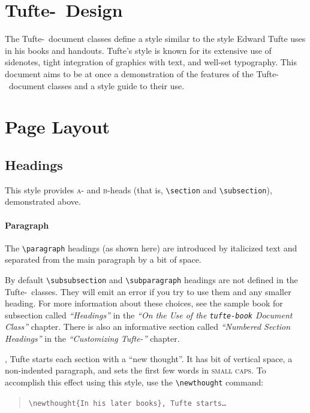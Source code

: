 \documentclass[a4paper]{tufte-handout}
\newcommand{\TL}{Tufte-\hologo{LaTeX}\xspace}
\newcommand{\hlorange}[1]{\textcolor{tufte-orange}{#1}}
\newcommand{\doccmd}[1]{\hlorange{\texttt{\textbackslash#1}}}
\newenvironment{docspec}
  {\begin{quotation}\ttfamily\parskip0pt\parindent0pt\ignorespaces}
  {\end{quotation}}
\begin{document}
\section{\TL\ Design}\label{sec:tufte-latex-design}
The \TL\ document classes define a style similar to the style Edward Tufte uses in his books and handouts.
Tufte's style is known for its extensive use of sidenotes, tight integration of graphics with text, and well-set typography.
This document aims to be at once a demonstration of the features of the \TL\ document classes and a style guide to their use.

\section{Page Layout}\label{sec:page-layout}
\subsection{Headings}\label{sec:headings}
This style provides \textsc{a}- and \textsc{b}-heads (that is, \doccmd{section} and \doccmd{subsection}), demonstrated above.
\paragraph{Paragraph} The \doccmd{paragraph} headings (as shown here) are introduced by italicized text and separated from the main paragraph by a bit of space.

By default \doccmd{subsubsection} and \doccmd{subparagraph} headings are not defined in the \TL\ classes.
They will emit an error if you try to use them and any smaller heading.
For more information about these choices, see the sample book for subsection called \textit{``Headings''} in the \textit{``On the Use of the \texttt{tufte-book} Document Class''} chapter.
There is also an informative section called \textit{``Numbered Section Headings''} in the \textit{``Customizing \TL''} chapter.

,\cite{Tufte2006} Tufte starts each section with a ``new thought''.
It has bit of vertical space, a non-indented paragraph, and sets the first few words in \textsc{small caps}.
To accomplish this effect using this style, use the \Verb|\newthought| command:
\begin{docspec}
  \doccmd{newthought\{In his later books\}, Tufte starts\ldots}
\end{docspec}
\end{document}
